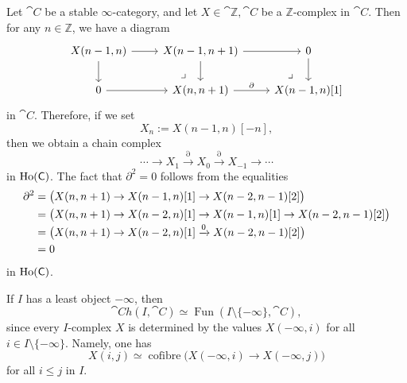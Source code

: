 \begin{example}
    Let $\cat{C}$ be a stable $\infty$-category,
    and let $X\in\cat{\mathbb{Z},\cat{C}}$ be a $\mathbb{Z}$-complex in $\cat{C}$.
    Then for any $n\in\mathbb{Z}$, we have a diagram
    \[\begin{tikzcd}
        X(n-1,n)\ar[r]\ar[d]\ar[dr,phantom,end anchor=north,pos=.75,"\lrcorner"] &
        X(n-1,n+1)\ar[r]\ar[d]\ar[dr,phantom,end anchor=north,pos=.75,"\lrcorner"] & 0\ar[d] \\
        0\ar[r] & X(n,n+1)\ar[r,"\partial"] & X(n-1,n)[1]
    \end{tikzcd}\]
    in $\cat{C}$. Therefore, if we set 
    \[X_n:=X(n-1,n)[-n],\]
    then we obtain a chain complex 
    \[ \cdots\to X_1\xrightarrow{\partial}X_0\xrightarrow{\partial}X_{-1}\to\cdots \]
    in $\operatorname{Ho}(\mathsf{C})$. The fact that $\partial^2=0$ follows from the equalities
    \[\begin{aligned}
        \partial^2
        &=\bigl(X(n,n+1)\to X(n-1,n)[1]\to X(n-2,n-1)[2]\bigr)\\
        &=\bigl(X(n,n+1)\to X(n-2,n)[1]\to X(n-1,n)[1]\to X(n-2,n-1)[2]\bigr)\\
        &=\bigl(X(n,n+1)\to X(n-2,n)[1]\smash{{}\xrightarrow0{}}X(n-2,n-1)[2]\bigr)\\
        &=0
    \end{aligned}\]
    in $\operatorname{Ho}(\mathsf{C})$. \varqed
\end{example}

\begin{remark}
    If $I$ has a least object $-\infty$, then
    \[ \cat{Ch}(I,\cat{C})\simeq\operatorname{Fun}(I\setminus\{-\infty\},\cat{C}), \]
    since every $I$-complex $X$ is determined by the values $X(-\infty,i)$
    for all $i\in I\setminus\{-\infty\}$. Namely, one has 
    \[ X(i,j)\simeq\operatorname{cofibre}\bigl(X(-\infty,i)\to X(-\infty,j)\bigr) \]
    for all $i\leq j$ in $I$. \varqed
\end{remark}

